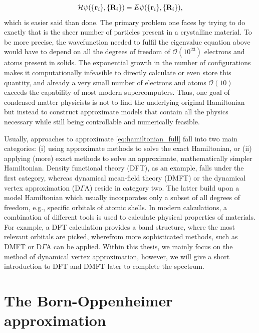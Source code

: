 \documentclass[../../main.tex]{subfiles}
\begin{document}
\begin{align}
	\mathcal{H}\psi(\{\textbf{r}_i\},\{\textbf{R}_i\})=E\psi(\{\textbf{r}_i\},\{\textbf{R}_i\}),
\end{align}
which is easier said than done. The primary problem one faces by trying to do exactly that is the sheer number of particles present in a crystalline material. To be more precise, the wavefunction needed to fulfil the eigenvalue equation above would have to depend on all the degrees of freedom of $\mathcal{O}(10^{23})$ electrons and atoms present in solids. The exponential growth in the number of configurations makes it computationally infeasible to directly calculate or even store this quantity, and already a very small number of electrons and atoms $\mathcal{O}(10)$ exceeds the capability of most modern supercomputers. Thus, one goal of condensed matter physicists is not to find the underlying original Hamiltonian but instead to construct approximate models that contain all the physics necessary while still being controllable and numerically feasible.

Usually, approaches to approximate \eqref{eq:hamiltonian_full} fall into two main categories: (i) using approximate methods to solve the exact Hamiltonian, or (ii) applying (more) exact methods to solve an approximate, mathematically simpler Hamiltonian. Density functional theory (DFT), as an example, falls under the first category, whereas dynamical mean-field theory (DMFT) or the dynamical vertex approximation ($\text{D}\Gamma\text{A}$) reside in category two. The latter build upon a model Hamiltonian which usually incorporates only a subset of all degrees of freedom, e.g., specific orbitals of atomic shells. In modern calculations, a combination of different tools is used to calculate physical properties of materials. For example, a DFT calculation provides a band structure, where the most relevant orbitals are picked, wherefrom more sophisticated methods, such as DMFT or $\text{D}\Gamma\text{A}$ can be applied. Within this thesis, we mainly focus on the method of dynamical vertex approximation, however, we will give a short introduction to DFT and DMFT later to complete the spectrum. 

\section{The Born-Oppenheimer approximation}
\end{document}
